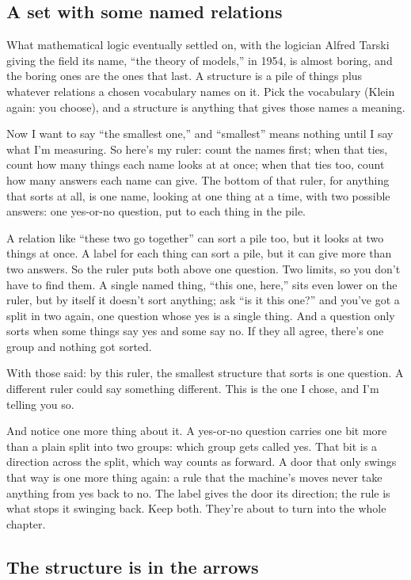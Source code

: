 \documentclass[11pt,twoside]{article}
\theoremstyle{thielethm}
\theoremstyle{thieledef}
\theoremstyle{thieledef}
\theoremstyle{thieledef}
\theoremstyle{thielethm}
\theoremstyle{thieleobs}
\theoremstyle{thielethm}
\begin{document}
\subsection{A set with some named relations}

What mathematical logic eventually settled on, with the logician Alfred Tarski giving the field its name, ``the theory of models,'' in 1954, is almost boring, and the boring ones are the ones that last. A structure is a pile of things plus whatever relations a chosen vocabulary names on it. Pick the vocabulary (Klein again: you choose), and a structure is anything that gives those names a meaning.

Now I want to say ``the smallest one,'' and ``smallest'' means nothing until I say what I'm measuring. So here's my ruler: count the names first; when that ties, count how many things each name looks at at once; when that ties too, count how many answers each name can give. The bottom of that ruler, for anything that sorts at all, is one name, looking at one thing at a time, with two possible answers: one yes-or-no question, put to each thing in the pile.

A relation like ``these two go together'' can sort a pile too, but it looks at two things at once. A label for each thing can sort a pile, but it can give more than two answers. So the ruler puts both above one question. Two limits, so you don't have to find them. A single named thing, ``this one, here,'' sits even lower on the ruler, but by itself it doesn't sort anything; ask ``is it this one?'' and you've got a split in two again, one question whose yes is a single thing. And a question only sorts when some things say yes and some say no. If they all agree, there's one group and nothing got sorted.

With those said: by this ruler, the smallest structure that sorts is one question. A different ruler could say something different. This is the one I chose, and I'm telling you so.

And notice one more thing about it. A yes-or-no question carries one bit more than a plain split into two groups: which group gets called yes. That bit is a direction across the split, which way counts as forward. A door that only swings that way is one more thing again: a rule that the machine's moves never take anything from yes back to no. The label gives the door its direction; the rule is what stops it swinging back. Keep both. They're about to turn into the whole chapter.

\subsection{The structure is in the arrows}
\end{document}
